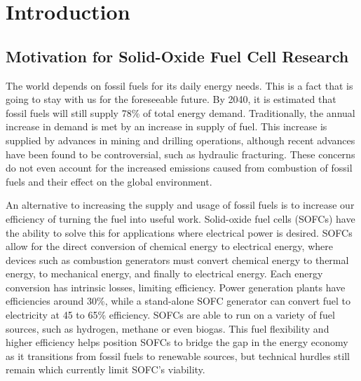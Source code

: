 


\chapter{Introduction}

\section{Motivation for Solid-Oxide Fuel Cell Research}

The world depends on fossil fuels for its daily energy needs.
This is a fact that is going to stay with us for the foreseeable future.
By 2040, it is estimated that fossil fuels will still supply  78\% of total energy demand.\cite{U.S.EnergyInformationAdministration2016}
Traditionally, the annual increase in demand is met by an increase in supply of fuel.
This increase is supplied by advances in mining and drilling operations, although recent advances have been found to be controversial, such as hydraulic fracturing.\cite{Osborn2011,Vengosh2014}
These concerns do not even account for the increased emissions caused from combustion of fossil fuels and their effect on the global environment.\cite{Solomon2009,Hansen1981,U.S.EnvironmentalProtectionAgency2017}

An alternative to increasing the supply and usage of fossil fuels is to increase our efficiency of turning the fuel into useful work.
Solid-oxide fuel cells (SOFCs) have the ability to solve this for applications where electrical power is desired.
SOFCs allow for the direct conversion of chemical energy to electrical energy, where devices such as combustion generators must convert chemical energy to thermal energy, to mechanical energy, and finally to electrical energy.
Each energy conversion has intrinsic losses, limiting efficiency.
Power generation plants have efficiencies around 30\%, while a stand-alone SOFC generator can convert fuel to electricity at 45 to 65\% efficiency.\cite{Wachsman2011a,Lasseter2004}
SOFCs are able to run on a variety of fuel sources, such as hydrogen, methane or even biogas.\cite{Park2000,Minh2004}
This fuel flexibility and higher efficiency helps position SOFCs to bridge the gap in the energy economy as it transitions from fossil fuels to renewable sources, but technical hurdles still remain which currently limit SOFC's viability.

